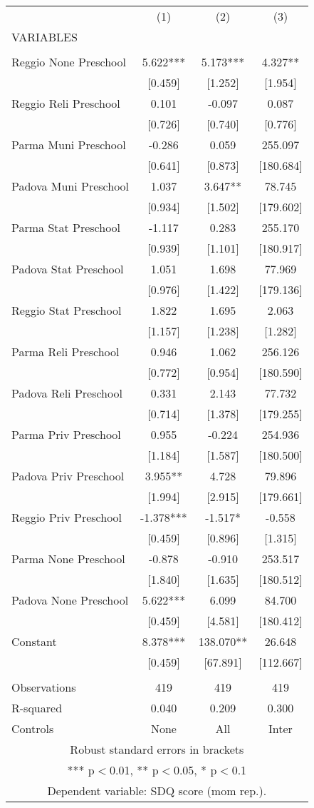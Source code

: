 \begin{tabular}{lccc} \hline
 & (1) & (2) & (3) \\
VARIABLES &  &  &  \\ \hline
 &  &  &  \\
Reggio None Preschool & 5.622*** & 5.173*** & 4.327** \\
 & [0.459] & [1.252] & [1.954] \\
Reggio Reli Preschool & 0.101 & -0.097 & 0.087 \\
 & [0.726] & [0.740] & [0.776] \\
Parma Muni Preschool & -0.286 & 0.059 & 255.097 \\
 & [0.641] & [0.873] & [180.684] \\
Padova Muni Preschool & 1.037 & 3.647** & 78.745 \\
 & [0.934] & [1.502] & [179.602] \\
Parma Stat Preschool & -1.117 & 0.283 & 255.170 \\
 & [0.939] & [1.101] & [180.917] \\
Padova Stat Preschool & 1.051 & 1.698 & 77.969 \\
 & [0.976] & [1.422] & [179.136] \\
Reggio Stat Preschool & 1.822 & 1.695 & 2.063 \\
 & [1.157] & [1.238] & [1.282] \\
Parma Reli Preschool & 0.946 & 1.062 & 256.126 \\
 & [0.772] & [0.954] & [180.590] \\
Padova Reli Preschool & 0.331 & 2.143 & 77.732 \\
 & [0.714] & [1.378] & [179.255] \\
Parma Priv Preschool & 0.955 & -0.224 & 254.936 \\
 & [1.184] & [1.587] & [180.500] \\
Padova Priv Preschool & 3.955** & 4.728 & 79.896 \\
 & [1.994] & [2.915] & [179.661] \\
Reggio Priv Preschool & -1.378*** & -1.517* & -0.558 \\
 & [0.459] & [0.896] & [1.315] \\
Parma None Preschool & -0.878 & -0.910 & 253.517 \\
 & [1.840] & [1.635] & [180.512] \\
Padova None Preschool & 5.622*** & 6.099 & 84.700 \\
 & [0.459] & [4.581] & [180.412] \\
Constant & 8.378*** & 138.070** & 26.648 \\
 & [0.459] & [67.891] & [112.667] \\
 &  &  &  \\
Observations & 419 & 419 & 419 \\
R-squared & 0.040 & 0.209 & 0.300 \\
 Controls & None & All & Inter \\ \hline
\multicolumn{4}{c}{ Robust standard errors in brackets} \\
\multicolumn{4}{c}{ *** p$<$0.01, ** p$<$0.05, * p$<$0.1} \\
\multicolumn{4}{c}{ Dependent variable: SDQ score (mom rep.).} \\
\end{tabular}
